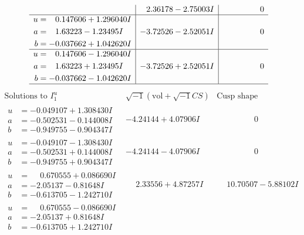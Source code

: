 \documentclass[1p]{elsarticle_modified}
\theoremstyle{definition}
\newcommand{\I}{\sqrt{-1}}
\begin{document}
$$\begin{array}{c|c|c}
 & \phantom{-}2.36178 - 2.75003 I & \phantom{-0.000000 } 0 \\ \hline\begin{aligned}
u &= \phantom{-}0.147606 + 1.296040 I \\
a &= \phantom{-}1.63223 - 1.23495 I \\
b &= -0.037662 + 1.042620 I\end{aligned}
 & -3.72526 - 2.52051 I & \phantom{-0.000000 } 0 \\ \hline\begin{aligned}
u &= \phantom{-}0.147606 - 1.296040 I \\
a &= \phantom{-}1.63223 + 1.23495 I \\
b &= -0.037662 - 1.042620 I\end{aligned}
 & -3.72526 + 2.52051 I & \phantom{-0.000000 } 0\\
 \hline 
 \end{array}$$\newpage$$\begin{array}{c|c|c}  
\text{Solutions to }I^u_{1}& \I (\text{vol} + \sqrt{-1}CS) & \text{Cusp shape}\\
 \hline 
\begin{aligned}
u &= -0.049107 + 1.308430 I \\
a &= -0.502531 - 0.144008 I \\
b &= -0.949755 - 0.904347 I\end{aligned}
 & -4.24144 + 4.07906 I & \phantom{-0.000000 } 0 \\ \hline\begin{aligned}
u &= -0.049107 - 1.308430 I \\
a &= -0.502531 + 0.144008 I \\
b &= -0.949755 + 0.904347 I\end{aligned}
 & -4.24144 - 4.07906 I & \phantom{-0.000000 } 0 \\ \hline\begin{aligned}
u &= \phantom{-}0.670555 + 0.086690 I \\
a &= -2.05137 - 0.81648 I \\
b &= -0.613705 - 1.242710 I\end{aligned}
 & \phantom{-}2.33556 + 4.87257 I & \phantom{-}10.70507 - 5.88102 I \\ \hline\begin{aligned}
u &= \phantom{-}0.670555 - 0.086690 I \\
a &= -2.05137 + 0.81648 I \\
b &= -0.613705 + 1.242710 I\end{aligned}

\end{array}$$
\end{document}
